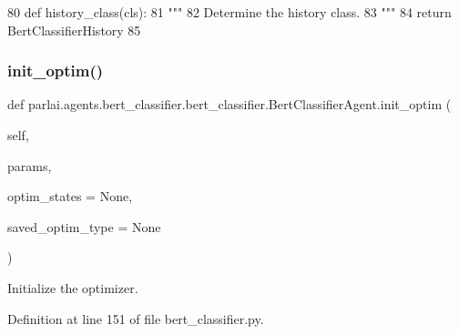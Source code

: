 \begin{DoxyCode}
80     \textcolor{keyword}{def }history\_class(cls):
81         \textcolor{stringliteral}{"""}
82 \textcolor{stringliteral}{        Determine the history class.}
83 \textcolor{stringliteral}{        """}
84         \textcolor{keywordflow}{return} BertClassifierHistory
85 
\end{DoxyCode}
\mbox{\label{classparlai_1_1agents_1_1bert__classifier_1_1bert__classifier_1_1BertClassifierAgent_aaf78ab1d312861ef4ba73bc7813e68aa}} 
\subsubsection{\texorpdfstring{init\+\_\+optim()}{init\_optim()}}
{\footnotesize\ttfamily def parlai.\+agents.\+bert\+\_\+classifier.\+bert\+\_\+classifier.\+Bert\+Classifier\+Agent.\+init\+\_\+optim (\begin{DoxyParamCaption}\item[{}]{self,  }\item[{}]{params,  }\item[{}]{optim\+\_\+states = {\ttfamily None},  }\item[{}]{saved\+\_\+optim\+\_\+type = {\ttfamily None} }\end{DoxyParamCaption})}

\begin{DoxyVerb}Initialize the optimizer.
\end{DoxyVerb}
 

Definition at line 151 of file bert\+\_\+classifier.\+py.


